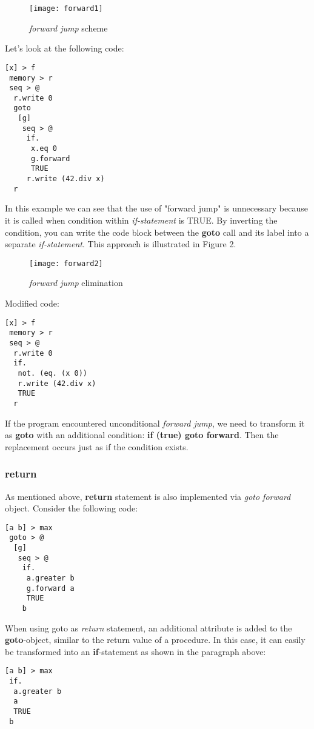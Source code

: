 \documentclass[two column]{article}
\begin{document}
\begin{figure}[h]
    \centering
    \texttt{[image: forward1]}
    \caption{\textit{forward jump} scheme}
    \label{fig:my_label}
\end{figure}


Let's look at the following code:
\begin{lstlisting}
[x] > f
 memory > r
 seq > @
  r.write 0
  goto
   [g]
    seq > @
     if.
      x.eq 0
      g.forward
      TRUE
     r.write (42.div x)
  r
\end{lstlisting}

In this example we can see that the use of "forward jump" is unnecessary because it is called when condition within \textit{if-statement} is TRUE. By inverting the condition, you can write the code block between the \textbf{goto} call and its label into a separate \textit{if-statement}. This approach is illustrated in Figure 2.

\begin{figure}[h]
    \centering
    \texttt{[image: forward2]}
    \caption{\textit{forward jump} elimination}
    \label{fig:my_label}
\end{figure}

Modified code:
\begin{lstlisting}
[x] > f
 memory > r
 seq > @
  r.write 0
  if.
   not. (eq. (x 0))
   r.write (42.div x)
   TRUE
  r
\end{lstlisting}

If the program encountered unconditional \textit{forward jump}, we need to transform it as \textbf{goto} with an additional condition: \textbf{if (true) goto forward}. Then the replacement occurs just as if the condition exists.

\subsubsection{return}
As mentioned above, \textbf{return} statement is also implemented via \textit{goto forward} object. Consider the following code:
\begin{lstlisting}
[a b] > max
 goto > @
  [g]
   seq > @
    if.
     a.greater b
     g.forward a
     TRUE
    b
\end{lstlisting}
When using goto as \textit{return} statement, an additional attribute is added to the \textbf{goto}-object, similar to the return value of a procedure. In this case, it can easily be transformed into an \textbf{if}-statement as shown in the paragraph above:
\begin{lstlisting}
[a b] > max
 if.
  a.greater b
  a
  TRUE
 b
\end{lstlisting}
\end{document}
